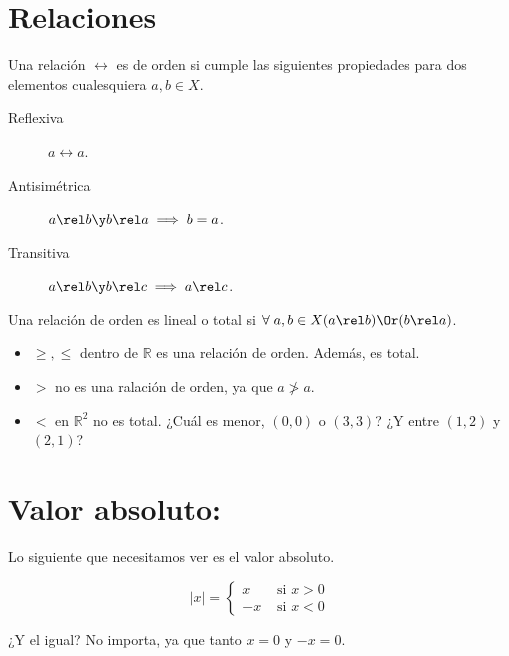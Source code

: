 
 
 \section{Relaciones}
\begin{defn}
Una relación $\rel$ es de orden si cumple las siguientes propiedades para dos elementos cualesquiera $a,b \in X$.
	\begin{description}
		\item[Reflexiva] $a\rel a$.
		\item[Antisimétrica] $a\rel b \y b\rel a \implies b=a$.
		\item[Transitiva] $a\rel b \y b\rel c \implies a\rel c$.
	\end{description}
\end{defn}

\begin{defn} Una relación de orden es lineal o total si $\forall \; a ,b \in X (a\rel b) \Or (b\rel a)$.
\end{defn}

\begin{example}
	\begin{itemize}
		\item $\geq,\leq$ dentro de $ℝ$ es una relación de orden. Además, es total.
		\item $>$ no es una ralación de orden, ya que $a\not> a$.
		\item $<$ en $ℝ^2$ no es total. ¿Cuál es menor, $(0,0) $ o $ (3,3)$? ¿Y entre $(1,2)$ y $(2,1)$?
	\end{itemize}
\end{example}






\section{Valor absoluto:}  Lo siguiente que necesitamos ver es el valor absoluto.

\begin{defn}
\[
	|x| = \left\{\begin{array}{cc}x & \text{ si } x>0\\-x & \text{ si } x<0 \end{array}\right.
\]
\end{defn}

¿Y el igual? No importa, ya que tanto $x=0$ y $-x = 0$.

